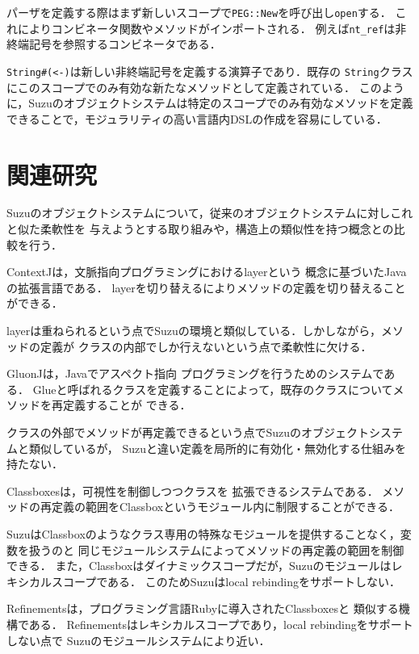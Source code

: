\documentclass{ipsjprosym}
\begin{document}
パーザを定義する際はまず新しいスコープで\verb|PEG::New|を呼び出し\verb|open|する．
これによりコンビネータ関数やメソッドがインポートされる．
例えば\verb|nt_ref|は非終端記号を参照するコンビネータである．

\verb|String#(<-)|は新しい非終端記号を定義する演算子であり．既存の
\verb|String|クラスにこのスコープでのみ有効な新たなメソッドとして定義されている．
このように，Suzuのオブジェクトシステムは特定のスコープでのみ有効なメソッドを定義
できることで，モジュラリティの高い言語内DSLの作成を容易にしている．

\section{関連研究}

Suzuのオブジェクトシステムについて，従来のオブジェクトシステムに対しこれと似た柔軟性を
与えようとする取り組みや，構造上の類似性を持つ概念との比較を行う．

ContextJ\cite{AppeltauerMalte:2011}は，文脈指向プログラミングにおけるlayerという
概念に基づいたJavaの拡張言語である．
layerを切り替えるによりメソッドの定義を切り替えることができる．

layerは重ねられるという点でSuzuの環境と類似している．しかしながら，メソッドの定義が
クラスの内部でしか行えないという点で柔軟性に欠ける．

GluonJ\cite{Chiba:2010:MMC:1869459.1869503}は，Javaでアスペクト指向
プログラミングを行うためのシステムである．
Glueと呼ばれるクラスを定義することによって，既存のクラスについてメソッドを再定義することが
できる．

クラスの外部でメソッドが再定義できるという点でSuzuのオブジェクトシステムと類似しているが，
Suzuと違い定義を局所的に有効化・無効化する仕組みを持たない．

Classboxes\cite{Bergel:2005:CCV:1646591.1646599}は，可視性を制御しつつクラスを
拡張できるシステムである．
メソッドの再定義の範囲をClassboxというモジュール内に制限することができる．

SuzuはClassboxのようなクラス専用の特殊なモジュールを提供することなく，変数を扱うのと
同じモジュールシステムによってメソッドの再定義の範囲を制御できる．
また，Classboxはダイナミックスコープだが，Suzuのモジュールはレキシカルスコープである．
このためSuzuはlocal rebindingをサポートしない．

Refinements\cite{Maeda:2013}は，プログラミング言語Rubyに導入されたClassboxesと
類似する機構である．
Refinementsはレキシカルスコープであり，local rebindingをサポートしない点で
Suzuのモジュールシステムにより近い．
\end{document}
